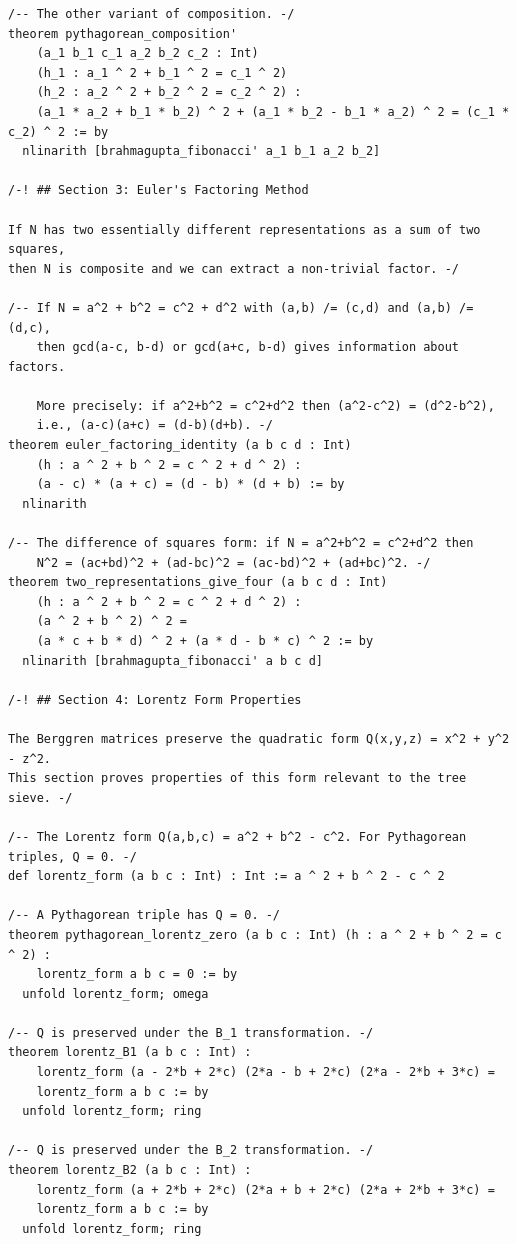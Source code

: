 \documentclass[11pt,openright,twoside]{book}
\theoremstyle{definition}
\begin{document}
\begin{lstlisting}[style=lean]
/-- The other variant of composition. -/
theorem pythagorean_composition'
    (a_1 b_1 c_1 a_2 b_2 c_2 : Int)
    (h_1 : a_1 ^ 2 + b_1 ^ 2 = c_1 ^ 2)
    (h_2 : a_2 ^ 2 + b_2 ^ 2 = c_2 ^ 2) :
    (a_1 * a_2 + b_1 * b_2) ^ 2 + (a_1 * b_2 - b_1 * a_2) ^ 2 = (c_1 * c_2) ^ 2 := by
  nlinarith [brahmagupta_fibonacci' a_1 b_1 a_2 b_2]

/-! ## Section 3: Euler's Factoring Method

If N has two essentially different representations as a sum of two squares,
then N is composite and we can extract a non-trivial factor. -/

/-- If N = a^2 + b^2 = c^2 + d^2 with (a,b) /= (c,d) and (a,b) /= (d,c),
    then gcd(a-c, b-d) or gcd(a+c, b-d) gives information about factors.
    
    More precisely: if a^2+b^2 = c^2+d^2 then (a^2-c^2) = (d^2-b^2),
    i.e., (a-c)(a+c) = (d-b)(d+b). -/
theorem euler_factoring_identity (a b c d : Int)
    (h : a ^ 2 + b ^ 2 = c ^ 2 + d ^ 2) :
    (a - c) * (a + c) = (d - b) * (d + b) := by
  nlinarith

/-- The difference of squares form: if N = a^2+b^2 = c^2+d^2 then
    N^2 = (ac+bd)^2 + (ad-bc)^2 = (ac-bd)^2 + (ad+bc)^2. -/
theorem two_representations_give_four (a b c d : Int)
    (h : a ^ 2 + b ^ 2 = c ^ 2 + d ^ 2) :
    (a ^ 2 + b ^ 2) ^ 2 =
    (a * c + b * d) ^ 2 + (a * d - b * c) ^ 2 := by
  nlinarith [brahmagupta_fibonacci' a b c d]

/-! ## Section 4: Lorentz Form Properties

The Berggren matrices preserve the quadratic form Q(x,y,z) = x^2 + y^2 - z^2.
This section proves properties of this form relevant to the tree sieve. -/

/-- The Lorentz form Q(a,b,c) = a^2 + b^2 - c^2. For Pythagorean triples, Q = 0. -/
def lorentz_form (a b c : Int) : Int := a ^ 2 + b ^ 2 - c ^ 2

/-- A Pythagorean triple has Q = 0. -/
theorem pythagorean_lorentz_zero (a b c : Int) (h : a ^ 2 + b ^ 2 = c ^ 2) :
    lorentz_form a b c = 0 := by
  unfold lorentz_form; omega

/-- Q is preserved under the B_1 transformation. -/
theorem lorentz_B1 (a b c : Int) :
    lorentz_form (a - 2*b + 2*c) (2*a - b + 2*c) (2*a - 2*b + 3*c) =
    lorentz_form a b c := by
  unfold lorentz_form; ring

/-- Q is preserved under the B_2 transformation. -/
theorem lorentz_B2 (a b c : Int) :
    lorentz_form (a + 2*b + 2*c) (2*a + b + 2*c) (2*a + 2*b + 3*c) =
    lorentz_form a b c := by
  unfold lorentz_form; ring


\end{lstlisting}
\end{document}
